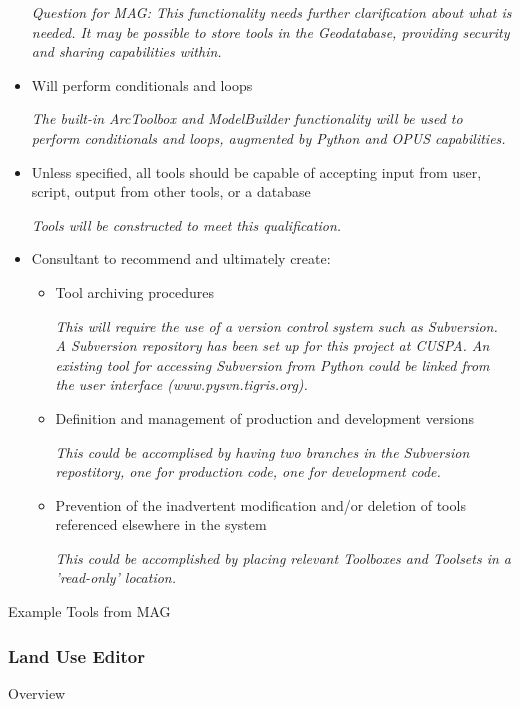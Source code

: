 \documentclass[titlepage]{article}
\begin{document}
\begin{itemize}
\emph{Question for MAG: This functionality needs further clarification about what is needed.  It may be possible to store tools in the Geodatabase, providing security and sharing capabilities within.}

\item Will perform conditionals and loops

\emph{The built-in ArcToolbox and ModelBuilder functionality will be used to perform conditionals and loops, augmented by Python and OPUS capabilities.}

\item Unless specified, all tools should be capable of accepting input from user, script, output from other tools, or a database

\emph{Tools will be constructed to meet this qualification.}

\item Consultant to recommend and ultimately create:
\begin{itemize}
\item Tool archiving procedures

\emph{This will require the use of a version control system such as Subversion. A Subversion repository has been set up for this project at CUSPA. An existing tool for accessing Subversion from Python could be linked from the user interface (www.pysvn.tigris.org). }

\item Definition and management of production and development versions

\emph{This could be accomplised by having two branches in the Subversion repostitory, one for production code, one for development code.}

\item Prevention of the inadvertent modification and/or deletion of tools referenced elsewhere in the system

\emph{This could be accomplished by placing relevant Toolboxes and Toolsets in a 'read-only' location.}

\end{itemize}
\end{itemize}

Example Tools from MAG

\subsubsection{Land Use Editor}

Overview
\end{document}
